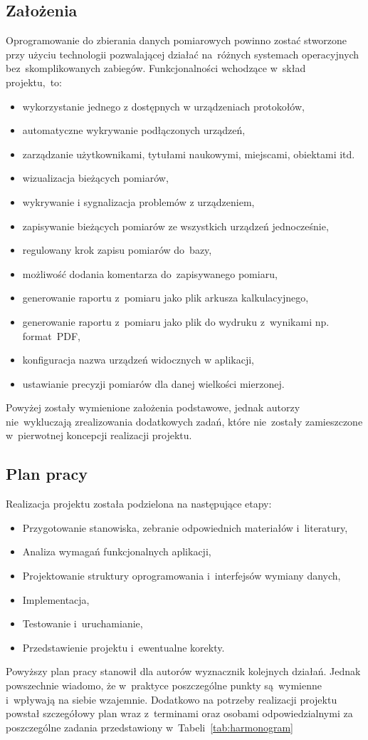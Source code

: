 \subsection{Założenia}
Oprogramowanie do zbierania danych pomiarowych powinno zostać stworzone przy użyciu technologii pozwalającej działać na~różnych systemach operacyjnych bez~skomplikowanych zabiegów. Funkcjonalności wchodzące w~skład projektu,~to:
\begin{itemize}
\item wykorzystanie jednego z dostępnych w urządzeniach protokołów,
\item automatyczne wykrywanie podłączonych urządzeń,
\item zarządzanie użytkownikami, tytułami naukowymi, miejscami, obiektami itd.
\item wizualizacja bieżących pomiarów,
\item wykrywanie i sygnalizacja problemów z urządzeniem,
\item zapisywanie bieżących pomiarów ze wszystkich urządzeń jednocześnie,
\item regulowany krok zapisu pomiarów do~bazy,
\item możliwość dodania komentarza do~zapisywanego pomiaru,
\item generowanie raportu z~pomiaru jako plik arkusza kalkulacyjnego,
\item generowanie raportu z~pomiaru jako plik do wydruku z~wynikami np. format~PDF,
\item konfiguracja nazwa urządzeń widocznych w aplikacji,
\item ustawianie precyzji pomiarów dla danej wielkości mierzonej.
\end{itemize}
\indent
\indent Powyżej zostały wymienione założenia podstawowe, jednak autorzy nie~wykluczają zrealizowania dodatkowych zadań, które nie~zostały zamieszczone w~pierwotnej koncepcji realizacji projektu.

\subsection{Plan pracy}
Realizacja projektu została podzielona na następujące etapy:
\begin{itemize}
\item Przygotowanie stanowiska, zebranie odpowiednich materiałów i~literatury,
\item Analiza wymagań funkcjonalnych aplikacji,
\item Projektowanie struktury oprogramowania i~interfejsów wymiany danych,
\item Implementacja,
\item Testowanie i~uruchamianie,
\item Przedstawienie projektu i~ewentualne korekty.
\end{itemize}
\indent
\indent Powyższy plan pracy stanowił dla autorów wyznacznik kolejnych działań. Jednak powszechnie wiadomo, że w~praktyce poszczególne punkty są~wymienne i~wpływają na siebie wzajemnie. Dodatkowo na potrzeby realizacji projektu powstał szczegółowy plan wraz z~terminami oraz osobami odpowiedzialnymi za poszczególne zadania przedstawiony w~Tabeli~\ref{tab:harmonogram}

